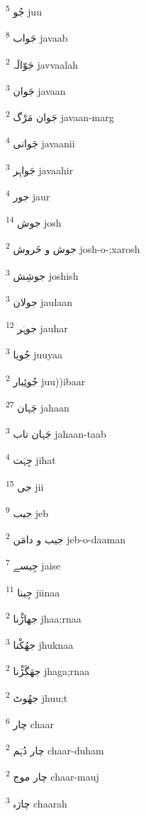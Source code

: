 \documentclass[12pt]{article}
\begin{document}
\begin{RTL}
\begin{multicols}{5}
{\ur جُو}   \textsuperscript{5} juu

{\ur جَواب}   \textsuperscript{8} javaab

{\ur جَوّالَہ}   \textsuperscript{2} javvaalah

{\ur جَوان}   \textsuperscript{3} javaan

{\ur جَوان مَرْگ}   \textsuperscript{2} javaan-marg

{\ur جَوانی}   \textsuperscript{4} javaanii

{\ur جَواہِر}   \textsuperscript{3} javaahir

{\ur جور}   \textsuperscript{4} jaur

{\ur جوش}   \textsuperscript{14} josh

{\ur جوش و خَروش}   \textsuperscript{2} josh-o-;xarosh

{\ur جوشِش}   \textsuperscript{3} joshish

{\ur جولان}   \textsuperscript{3} jaulaan

{\ur جوہَر}   \textsuperscript{12} jauhar

{\ur جُویا}   \textsuperscript{3} juuyaa

{\ur جُوئِبار}   \textsuperscript{2} juu))ibaar

{\ur جَہان}   \textsuperscript{27} jahaan

{\ur جَہان تاب}   \textsuperscript{3} jahaan-taab

{\ur جِہَت}   \textsuperscript{4} jihat

{\ur جی}   \textsuperscript{15} jii

{\ur جیب}   \textsuperscript{9} jeb

{\ur جیب و دامَن}   \textsuperscript{2} jeb-o-daaman

{\ur جِیسے}   \textsuperscript{7} jaise

{\ur جِینا}   \textsuperscript{11} jiinaa

{\ur جھاڑْنا}   \textsuperscript{2} jhaa;rnaa

{\ur جھُکْنا}   \textsuperscript{3} jhuknaa

{\ur جھَگَڑْنا}   \textsuperscript{2} jhaga;rnaa

{\ur جھُوٹ}   \textsuperscript{2} jhuu;t

{\ur چار}   \textsuperscript{6} chaar

{\ur چار دُہَم}   \textsuperscript{2} chaar-duham

{\ur چار موج}   \textsuperscript{2} chaar-mauj

{\ur چارَہ}   \textsuperscript{3} chaarah


\end{multicols}
\end{RTL}
\end{document}
